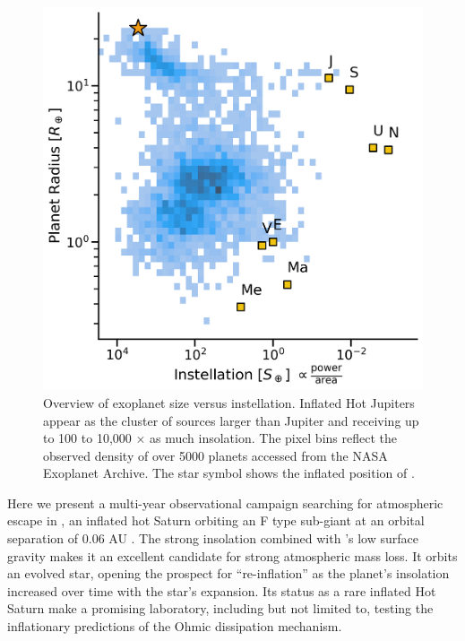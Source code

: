 \documentclass[twocolumn]{aastex631}
\newcommand{\hatpb}{\object{HAT-P-67 b}}
\begin{document}
\begin{figure}
    \centering
    \includegraphics[width=\linewidth]{figures/HAT-P-67b_radius_valley.png}
    \caption{Overview of exoplanet size versus instellation.  Inflated Hot Jupiters appear as the cluster of sources larger than Jupiter and receiving up to 100 to 10,000 $\times$ as much insolation.  The pixel bins reflect the observed density of over 5000 planets accessed from the NASA Exoplanet Archive.  The star symbol shows the inflated position of \hatpb.}
    \label{fig:instellation}
\end{figure}

Here we present a multi-year observational campaign searching for atmospheric escape in , an inflated hot Saturn orbiting an F type sub-giant at an orbital separation of 0.06 AU \citep{2017AJ....153..211Z}.  The strong insolation combined with 's low surface gravity makes it an excellent candidate for strong atmospheric mass loss.  It orbits an evolved star, opening the prospect for ``re-inflation'' as the planet's insolation increased over time with the star's expansion.  Its status as a rare inflated Hot Saturn make  a promising laboratory, including but not limited to, testing the inflationary predictions of the Ohmic dissipation mechanism.
\end{document}
